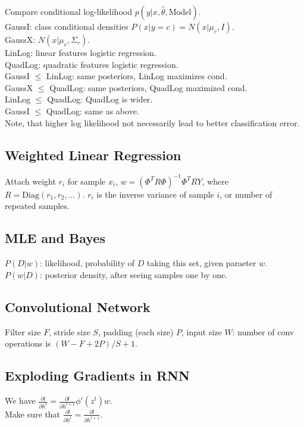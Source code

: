 Compare conditional log-likelihood $p(y|x, \hat{\theta}, \text{Model})$.\\
GaussI: class conditional densities $P(x|y=c) = N(x|\mu_c, I)$.\\
GaussX: $N(x|\mu_c, \Sigma_c)$.\\
LinLog: linear features logistic regression.\\
QuadLog: quadratic features logistic regression.\\
GaussI $\leq$ LinLog: same posteriors, LinLog maximizes cond.\\
GaussX $\leq$ QuadLog: same posteriors, QuadLog maximized cond.\\
LinLog $\leq$ QuadLog: QuadLog is wider.\\
GaussI $\leq$ QuadLog: same as above.\\
Note, that higher log likelihood not necessarily lead to better classification error.

\subsection*{Weighted Linear Regression}

Attach weight $r_i$ for sample $x_i$, $w = (\Phi^T R \Phi)^{-1}\Phi^T R Y$, where $R = \text{Diag}(r_1, r_2, \dots)$. $r_i$ is the inverse variance of sample $i$, or number of repeated samples.

\subsection*{MLE and Bayes}

$P(D|w)$: likelihood, probability of $D$ taking this set, given paraeter $w$.\\
$P(w|D)$: posterior density, after seeing samples one by one.

\subsection*{Convolutional Network}

Filter size $F$, stride size $S$, padding (each size) $P$, input size $W$: number of conv operations is $(W-F+2P)/S + 1$.

\subsection*{Exploding Gradients in RNN}

We have $\frac{\partial l}{\partial h^t} = \frac{\partial l}{\partial h^{t+1}} \phi'(z^t)w$.\\
Make sure that $\frac{\partial l}{\partial h^t} = \frac{\partial l}{\partial h^{t+1}}$.

